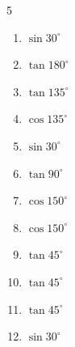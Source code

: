 \begin{multicols}{5}
\begin{enumerate}

  \item $\displaystyle \sin{30^\circ}$


  \item $\displaystyle \tan{180^\circ}$

        \phantom{$\displaystyle =0$}

  \item $\displaystyle \tan{135^\circ}$

        \phantom{$\displaystyle =-1$}

  \item $\displaystyle \cos{135^\circ}$


  \item $\displaystyle \sin{30^\circ}$


  \item $\displaystyle \tan{90^\circ}$

        \phantom{$\displaystyle なし$}

  \item $\displaystyle \cos{150^\circ}$


\columnbreak %

  \item $\displaystyle \cos{150^\circ}$


  \item $\displaystyle \tan{45^\circ}$

        \phantom{$\displaystyle =1$}

  \item $\displaystyle \tan{45^\circ}$

        \phantom{$\displaystyle =1$}

  \item $\displaystyle \tan{45^\circ}$

        \phantom{$\displaystyle =1$}

  \item $\displaystyle \sin{30^\circ}$



\end{enumerate}
\end{multicols}
